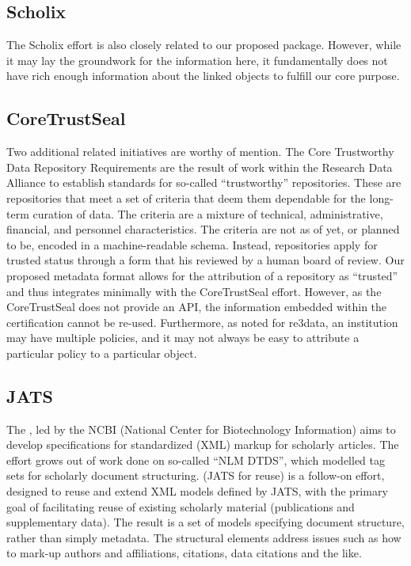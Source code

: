\subsection{Scholix}
The Scholix effort \parencite{Burton2017} is also closely related to our proposed package. However, while it may lay the groundwork for the information here, it fundamentally does not have rich enough information about the linked objects to fulfill our core purpose.

\subsection{CoreTrustSeal}
Two additional related initiatives are worthy of mention.   The Core Trustworthy Data Repository Requirements \citep{CoreTrustSealCoreTrustSeal2017} are the result of work within the Research Data Alliance to establish standards for so-called ``trustworthy'' repositories.  These are repositories that meet a set of criteria that deem them dependable for the long-term curation of data.  The criteria are a mixture of technical, administrative, financial, and personnel characteristics.  The criteria are not as of yet, or planned to be, encoded in a machine-readable schema.  Instead, repositories apply for trusted status through a form that his reviewed by a human board of review.  Our proposed metadata format allows for the attribution of a repository as ``trusted'' and thus integrates minimally with the CoreTrustSeal effort. However, as the CoreTrustSeal does not provide an \ac{API}, the information embedded within the certification cannot be re-used. Furthermore, as noted for re3data, an institution may have multiple policies, and it may not always be easy to attribute a particular policy to a particular object.  

\subsection{JATS}
The , led by the NCBI (National Center for Biotechnology Information) aims to develop specifications for standardized (XML) markup for scholarly articles.  The effort grows out of work done on so-called ``NLM DTDS'', which modelled tag sets for scholarly document structuring.   (JATS for reuse) is a follow-on effort, designed to reuse and extend XML models defined by JATS, with the primary goal of facilitating reuse of existing scholarly material (publications and supplementary data). The result is a set of models specifying document structure, rather than simply metadata.  The structural elements address issues such as how to mark-up authors and affiliations, citations, data citations and the like.

